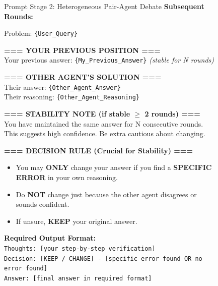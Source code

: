 \documentclass[11pt]{article}
\begin{document}
\begin{figure}[t]
\begin{promptbox}{Prompt Stage 2: Heterogeneous Pair-Agent Debate}
        \textbf{Subsequent Rounds:}

        Problem: \texttt{\{{User\_Query\}}}

        \vspace{2pt}

        \textbf{=== YOUR PREVIOUS POSITION ===} \\
        Your previous answer: \texttt{\{{My\_Previous\_Answer\}}} \textit{(stable for N rounds)}

        \vspace{2pt}

        \textbf{=== OTHER AGENT'S SOLUTION ===} \\
        Their answer: \texttt{\{{Other\_Agent\_Answer\}}} \\
        Their reasoning: \texttt{\{{Other\_Agent\_Reasoning\}}}

        \vspace{2pt}

        \textbf{=== STABILITY NOTE (if stable $\geq$ 2 rounds) ===} \\
        You have maintained the same answer for N consecutive rounds.
        This suggests high confidence. Be extra cautious about changing.

        \vspace{2pt}

        \textbf{=== DECISION RULE (Crucial for Stability) ===}
        \begin{itemize}[leftmargin=1.5em]
            \item You may \textbf{ONLY} change your answer if you find a \textbf{SPECIFIC ERROR} in your own reasoning.
            \item Do \textbf{NOT} change just because the other agent disagrees or sounds confident.
            \item If unsure, \textbf{KEEP} your original answer.
        \end{itemize}

        \vspace{2pt}

        \textbf{Required Output Format:} \\
        \texttt{Thoughts: [your step-by-step verification]} \\
         \texttt{Decision: [KEEP / CHANGE] - [specific error found OR no error found]} \\
        \texttt{Answer: [final answer in required format]}
    \end{promptbox}
    \label{fig:all_prompts_a}
\end{figure}
\end{document}
